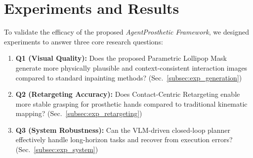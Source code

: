 \documentclass[letterpaper, 10 pt, conference]{ieeeconf}  %
\begin{document}


\section{Experiments and Results}
\label{sec:experiments}

To validate the efficacy of the proposed \emph{AgentProsthetic Framework}, we designed experiments to answer three core research questions:
\begin{enumerate}
    \item \textbf{Q1 (Visual Quality):} Does the proposed Parametric Lollipop Mask generate more physically plausible and context-consistent interaction images compared to standard inpainting methods? (Sec.~\ref{subsec:exp_generation})
    \item \textbf{Q2 (Retargeting Accuracy):} Does Contact-Centric Retargeting enable more stable grasping for prosthetic hands compared to traditional kinematic mapping? (Sec.~\ref{subsec:exp_retargeting})
    \item \textbf{Q3 (System Robustness):} Can the VLM-driven closed-loop planner effectively handle long-horizon tasks and recover from execution errors? (Sec.~\ref{subsec:exp_system})
\end{enumerate}
\end{document}
